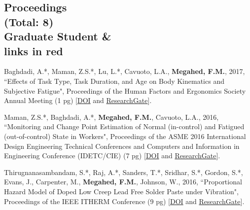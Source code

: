 \documentclass[margin,line]{res}
\begin{document}
\begin{resume}





\section{\sc Proceedings \\ (Total: 8) \\ \lbrack*Graduate Student \& \\ links in \textcolor{miamired}{red}\rbrack}
Baghdadi, A.*, Maman, Z.S.*, Lu, L.*, Cavuoto, L.A., \textbf{Megahed, F.M.}, 2017, ``Effects of Task Type, Task Duration, and Age on Body Kinematics and Subjective Fatigue", Proceedings of the Human Factors and Ergonomics Society Annual Meeting (1 pg) [\faFile*\href{https://doi.org/10.1177/1541931213601743}{DOI} and \faResearchgate \href{https://www.researchgate.net/publication/320088972_Effects_of_Task_Type_Task_Duration_and_Age_on_Body_Kinematics_and_Subjective_Fatigue}{ResearchGate}].

\vspace{-1.5mm}
Maman, Z.S.*, Baghdadi, A.*, \textbf{Megahed, F.M.}, Cavuoto, L.A., 2016, ``Monitoring and Change Point Estimation of Normal (in-control) and Fatigued (out-of-control) State in Workers", Proceedings of the ASME 2016 International Design Engineering Technical Conferences and Computers and Information in Engineering Conference (IDETC/CIE) (7 pg) [\faFile*\href{https://doi.org/10.1115/DETC2016-60487}{DOI} and \faResearchgate \href{https://www.researchgate.net/publication/307538993_Monitoring_and_Change_Point_Estimation_of_Normal_In-Control_and_Fatigued_Out-of-Control_State_in_Workers}{ResearchGate}].

\vspace{-1.5mm}
Thirugnanasambandam, S.*, Raj, A.*, Sanders, T.*, Sridhar, S.*, Gordon, S.*, Evans, J., Carpenter, M.,\textbf{ Megahed, F.M.}, Johnson, W., 2016, ``Proportional Hazard Model of Doped Low Creep Lead Free Solder Paste under Vibration", Proceedings of the IEEE ITHERM Conference (9 pg) [\faFile*\href{https://doi.org/10.1109/ITHERM.2016.7517685}{DOI} and \faResearchgate \href{https://www.researchgate.net/publication/305525479_Proportional_Hazard_Model_of_doped_low_creep_lead_free_solder_paste_under_vibration}{ResearchGate}].


\end{resume}
\end{document}
